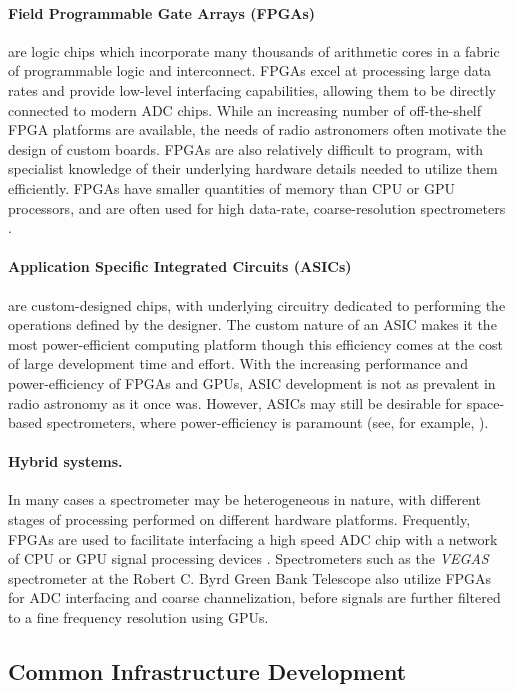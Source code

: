 \documentclass{ws-rv961x669}
\begin{document}
\paragraph{Field Programmable Gate Arrays (FPGAs)} are logic chips which incorporate many thousands of arithmetic cores in a fabric of programmable logic and interconnect. FPGAs excel at processing large data rates and provide low-level interfacing capabilities, allowing them to be directly connected to modern ADC chips. While an increasing number of off-the-shelf FPGA platforms are available, the needs of radio astronomers often motivate the design of custom boards. FPGAs are also relatively difficult to program, with specialist knowledge of their underlying hardware details needed to utilize them efficiently. FPGAs have smaller quantities of memory than CPU or GPU processors, and are often used for high data-rate, coarse-resolution spectrometers \citep{Stanko2005}.

\paragraph{Application Specific Integrated Circuits (ASICs)} are custom-designed chips, with underlying circuitry dedicated to performing the operations defined by the designer. The custom nature of an ASIC makes it the most power-efficient computing platform though this efficiency comes at the cost of large development time and effort.
With the increasing performance and power-efficiency of FPGAs and GPUs, ASIC development is not as prevalent in radio astronomy as it once was.
However, ASICs may still be desirable for space-based spectrometers, where power-efficiency is paramount (see, for example, \cite{hochman2014splash}).

\paragraph{Hybrid systems.} In many cases a spectrometer may be heterogeneous in nature, with different stages of processing performed on different hardware platforms.
Frequently, FPGAs are used to facilitate interfacing a high speed ADC chip with a network of CPU or GPU signal processing devices \citep{Siemion2011}. 
Spectrometers such as the \emph{VEGAS} spectrometer at the Robert C. Byrd Green Bank Telescope \citep{Prestage2015} also utilize FPGAs for ADC interfacing and coarse channelization, before signals are further filtered to a fine frequency resolution using GPUs.


\subsection{Common Infrastructure Development}
\end{document}
